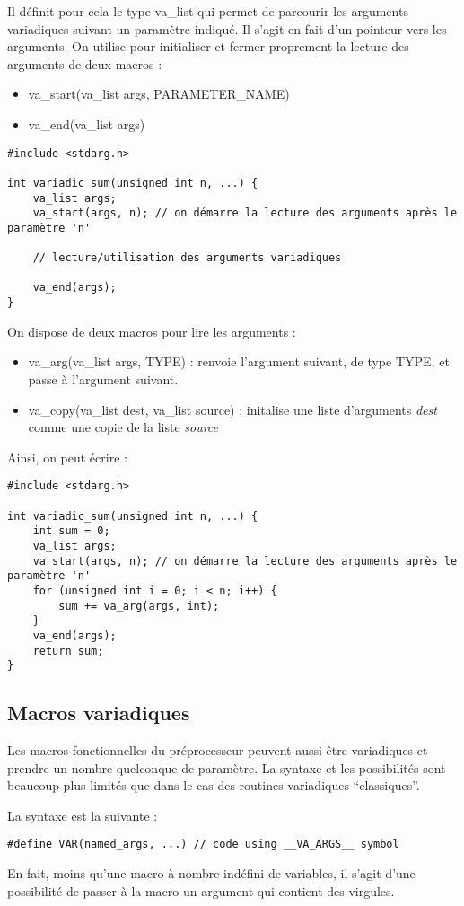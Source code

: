 \documentclass[../../../main.tex]{subfiles}
\begin{document}
Il définit pour cela le type \textsf{va\_list} qui permet de parcourir les arguments variadiques suivant un paramètre indiqué. Il s'agit en fait d'un pointeur vers les arguments. On utilise pour initialiser et fermer proprement la lecture des arguments de deux macros :
\begin{itemize}
	\item \textsf{va\_start(va\_list args, PARAMETER\_NAME)}
	\item \textsf{va\_end(va\_list args)}
\end{itemize}
\begin{verbatim}
#include <stdarg.h>

int variadic_sum(unsigned int n, ...) {
	va_list args;
	va_start(args, n); // on démarre la lecture des arguments après le paramètre 'n'

	// lecture/utilisation des arguments variadiques

	va_end(args);
}
\end{verbatim}
On dispose de deux macros pour lire les arguments :
\begin{itemize}
	\item \textsf{va\_arg(va\_list args, TYPE)} : renvoie l'argument suivant, de type \textsf{TYPE}, et passe à l'argument suivant. 
	\item \textsf{va\_copy(va\_list dest, va\_list source)} : initalise une liste d'arguments \textit{dest} comme une copie de la liste \textit{source}
\end{itemize}
Ainsi, on peut écrire :
\begin{verbatim}
#include <stdarg.h>

int variadic_sum(unsigned int n, ...) {
	int sum = 0;
	va_list args;
	va_start(args, n); // on démarre la lecture des arguments après le paramètre 'n'
	for (unsigned int i = 0; i < n; i++) {
		sum += va_arg(args, int);
	}
	va_end(args);
	return sum;
}
\end{verbatim}
\subsection{Macros variadiques}
Les macros fonctionnelles du préprocesseur peuvent aussi être variadiques et prendre un nombre quelconque de paramètre. La syntaxe et les possibilités sont beaucoup plus limités que dans le cas des routines variadiques ``classiques''.

La syntaxe est la suivante :
\begin{verbatim}
#define VAR(named_args, ...) // code using __VA_ARGS__ symbol
\end{verbatim}
En fait, moins qu'une macro à nombre indéfini de variables, il s'agit d'une possibilité de passer à la macro un argument qui contient des virgules.
\end{document}
